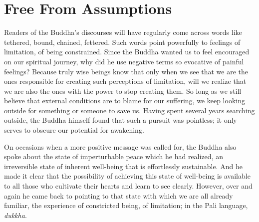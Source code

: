 

\chapter{Free From Assumptions}


Readers of the Buddha’s discourses will have regularly come across words
like tethered, bound, chained,
fettered\cite{dhp-276}.
Such words point powerfully to feelings of limitation, of being constrained. Since the
Buddha wanted us to feel encouraged on our spiritual journey, why did he
use negative terms so evocative of painful feelings? Because truly wise
beings know that only when we see that we are the ones responsible for
creating such perceptions of limitation, will we realize that we are
also the ones with the power to stop creating them. So long as we still
believe that external conditions are to blame for our suffering, we keep
looking outside for something or someone to save us. Having spent
several years searching outside, the Buddha himself found that such a
pursuit was pointless; it only serves to obscure our potential for
awakening.

On occasions when a more positive message was called for, the Buddha
also spoke about the state of imperturbable peace which he had realized,
an irreversible state of inherent well-being that is effortlessly
sustainable. And he made it clear that the possibility of achieving this
state of well-being is available to all those who cultivate their hearts
and learn to see clearly. However, over and again he came back to
pointing to that state with which we are all already familiar, the
experience of constricted being, of limitation; in the Pali language,
\emph{dukkha}.

